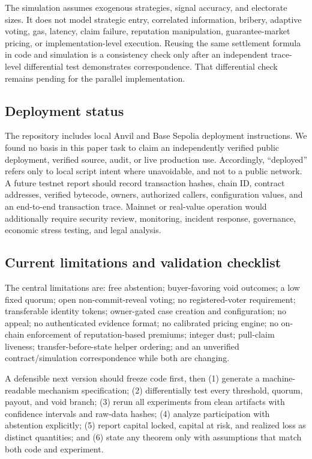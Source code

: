 The simulation assumes exogenous strategies, signal accuracy, and electorate sizes. It does not model
strategic entry, correlated information, bribery, adaptive voting, gas, latency, claim failure,
reputation manipulation, guarantee-market pricing, or implementation-level execution. Reusing the
same settlement formula in code and simulation is a consistency check only after an independent
trace-level differential test demonstrates correspondence. That differential check remains pending
for the parallel implementation.

\subsection{Deployment status}
\label{sec:deploy}

The repository includes local Anvil and Base Sepolia deployment instructions. We found no basis in
this paper task to claim an independently verified public deployment, verified source, audit, or live
production use. Accordingly, ``deployed'' refers only to local script intent where unavoidable, and
not to a public network. A future testnet report should record transaction hashes, chain ID, contract
addresses, verified bytecode, owners, authorized callers, configuration values, and an end-to-end
transaction trace. Mainnet or real-value operation would additionally require security review,
monitoring, incident response, governance, economic stress testing, and legal analysis.

\subsection{Current limitations and validation checklist}
\label{sec:limitations}

The central limitations are: free abstention; buyer-favoring void outcomes; a low fixed quorum; open
non-commit-reveal voting; no registered-voter requirement; transferable identity tokens; owner-gated
case creation and configuration; no appeal; no authenticated evidence format; no calibrated pricing
engine; no on-chain enforcement of reputation-based premiums; integer dust; pull-claim liveness;
transfer-before-state helper ordering; and an unverified contract/simulation correspondence while both
are changing.

A defensible next version should freeze code first, then (1) generate a machine-readable mechanism
specification; (2) differentially test every threshold, quorum, payout, and void branch; (3) rerun all
experiments from clean artifacts with confidence intervals and raw-data hashes; (4) analyze
participation with abstention explicitly; (5) report capital locked, capital at risk, and realized loss
as distinct quantities; and (6) state any theorem only with assumptions that match both code and
experiment.
